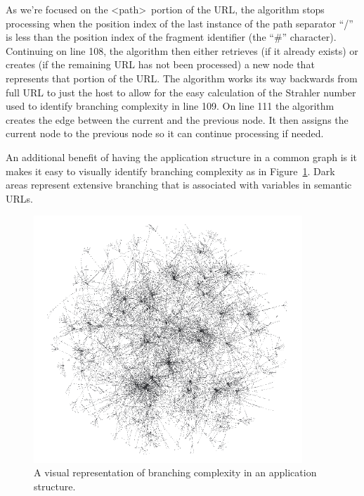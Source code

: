 As we're focused on the \textless path\textgreater\ portion of the URL, the algorithm stops processing when the position index of the last instance of the path separator ``/'' is less than the position index of the fragment identifier (the ``\#'' character).  Continuing on line 108, the algorithm then either retrieves (if it already exists) or creates (if the remaining URL has not been processed) a new node that represents that portion of the URL.  The algorithm works its way backwards from full URL to just the host to allow for the easy calculation of the Strahler number used to identify branching complexity in line 109.  On line 111 the algorithm creates the edge between the current and the previous node.  It then assigns the current node to the previous node so it can continue processing if needed.

An additional benefit of having the application structure in a common graph is it makes it easy to visually identify branching complexity as in Figure~\ref{fig:visualization}.  Dark areas represent extensive branching that is associated with variables in semantic URLs.

\begin{figure}[htb]
\centering
\includegraphics[width=0.9\textwidth]{images/thesis-graph-figure.png}
\caption{A visual representation of branching complexity in an application structure.}
\label{fig:visualization}
\end{figure}